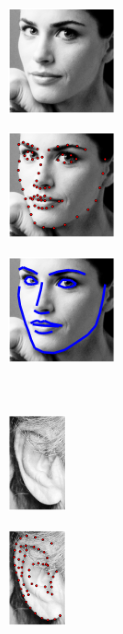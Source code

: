 \begin{figure}[t!]
    \centering
    \begin{subfigure}[b]{0.156\textwidth}
            \includegraphics[height=2.8cm]{resources/Fig_Intro/intro_0_0}
    \end{subfigure}
    \hfill
    \begin{subfigure}[b]{0.156\textwidth}
            \includegraphics[height=2.8cm]{resources/Fig_Intro/intro_0_1}
    \end{subfigure}
  	\hfill
    \begin{subfigure}[b]{0.156\textwidth}
            \includegraphics[height=2.8cm]{resources/Fig_Intro/intro_0_2}
    \end{subfigure}
    \\
    \begin{subfigure}[b]{0.085\textwidth}
            \includegraphics[height=2.55cm]{resources/Fig_Intro/intro_1_0}
    \end{subfigure}
    \hfill
    \begin{subfigure}[b]{0.085\textwidth}
            \includegraphics[height=2.55cm]{resources/Fig_Intro/intro_1_1}

\end{subfigure}
\end{figure}
